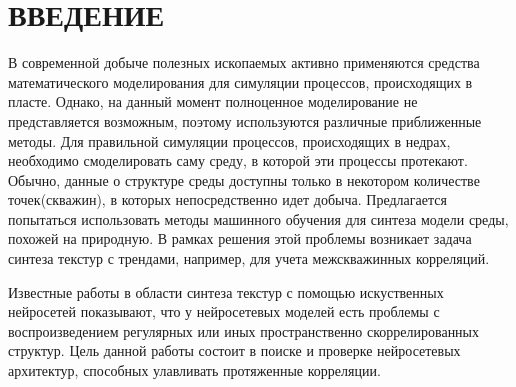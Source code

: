 \newpage
\section*{\hfil ВВЕДЕНИЕ \hfil}
	В современной добыче полезных ископаемых активно применяются средства математического моделирования для симуляции процессов, происходящих в пласте. Однако, на данный момент полноценное моделирование не представляется возможным, поэтому используются различные приближенные методы. Для правильной симуляции процессов, происходящих в недрах, необходимо смоделировать саму среду, в которой эти процессы протекают. Обычно, данные о структуре среды доступны только в некотором количестве точек(скважин), в которых непосредственно идет добыча. Предлагается попытаться использовать методы машинного обучения для синтеза модели среды, похожей на природную. В рамках решения этой проблемы возникает задача синтеза текстур с трендами, например, для учета межскважинных корреляций.
	
	Известные работы в области синтеза текстур с помощью искуственных нейросетей \cite{texture-synthesis-using-CNN, texture-networks} показывают, что у нейросетевых моделей есть проблемы с воспроизведением регулярных или иных пространственно скоррелированных структур. Цель данной работы состоит в поиске и проверке нейросетевых архитектур, способных улавливать протяженные корреляции.
